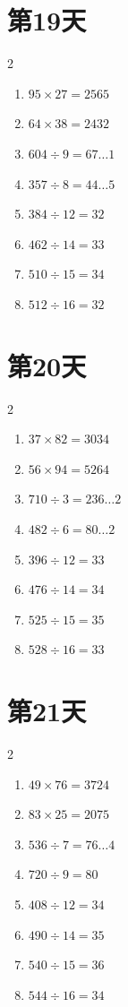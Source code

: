 \documentclass[12pt]{ctexart}
\begin{document}
	\section*{第19天}
	\begin{multicols}{2}
		\begin{enumerate}[itemsep=0pt]
			\item $95 \times 27 = 2565$
			\item $64 \times 38 = 2432$
			\item $604 \div 9 = 67\ldots 1$
			\item $357 \div 8 = 44\ldots 5$
			\item $384 \div 12 = 32$
			\item $462 \div 14 = 33$
			\item $510 \div 15 = 34$
			\item $512 \div 16 = 32$
		\end{enumerate}
	\end{multicols}
	
	\section*{第20天}
	\begin{multicols}{2}
		\begin{enumerate}[itemsep=0pt]
			\item $37 \times 82 = 3034$
			\item $56 \times 94 = 5264$
			\item $710 \div 3 = 236\ldots 2$
			\item $482 \div 6 = 80\ldots 2$
			\item $396 \div 12 = 33$
			\item $476 \div 14 = 34$
			\item $525 \div 15 = 35$
			\item $528 \div 16 = 33$
		\end{enumerate}
	\end{multicols}
	
	\section*{第21天}
	\begin{multicols}{2}
		\begin{enumerate}[itemsep=0pt]
			\item $49 \times 76 = 3724$
			\item $83 \times 25 = 2075$
			\item $536 \div 7 = 76\ldots 4$
			\item $720 \div 9 = 80$
			\item $408 \div 12 = 34$
			\item $490 \div 14 = 35$
			\item $540 \div 15 = 36$
			\item $544 \div 16 = 34$
		\end{enumerate}
	\end{multicols}
	
\end{document}
